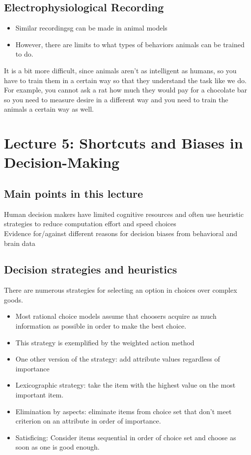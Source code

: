 \subsection{Electrophysiological Recording}
\begin{itemize}
    \item Similar recordingsg can be made in animal models
    \item However, there are limits to what types of behaviors animals can be trained to do.
\end{itemize}
It is a bit more difficult, since animals aren't as intelligent as humans, so you have to train them in a certain way so that they understand the task like we do. For example, you cannot ask a rat how much they would pay for a chocolate bar so you need to measure desire in a different way and you need to train the animals a certain way as well.

\section{Lecture 5: Shortcuts and Biases in Decision-Making}
\subsection{Main points in this lecture}
Human decision makers have limited cognitive resources and often use heuristic strategies to reduce computation effort and speed choices
\\Evidence for/against different reasons for decision biases from behavioral and brain data
\subsection{Decision strategies and heuristics}
There are numerous strategies for selecting an option in choices over complex goods.
\begin{itemize}
    \item Most rational choice models assume that choosers acquire as much information as possible in order to make the best choice.
    \item This strategy is exemplified by the weighted action method
    \item One other version of the strategy: add attribute values regardless of importance
    \item Lexicographic strategy: take the item with the highest value on the most important item.
    \item Elimination by aspects: eliminate items from choice set that don't meet criterion on an attribute in order of importance.
    \item Satisficing: Consider items sequential in order of choice set and choose as soon as one is good enough.

\end{itemize}


